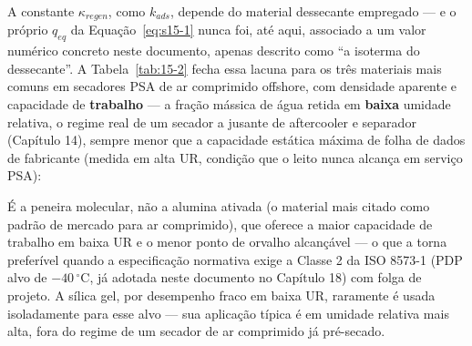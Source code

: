 \documentclass[12pt,a4paper]{article}
\numberwithin{equation}{section}
\numberwithin{table}{section}
\numberwithin{figure}{section}
\begin{document}
{		A constante $\kappa_{regen}$, como $k_{ads}$, depende do material dessecante empregado — e o próprio $q_{eq}$ da Equação~\eqref{eq:s15-1} nunca foi, até aqui, associado a um valor numérico concreto neste documento, apenas descrito como ``a isoterma do dessecante''. A Tabela~\ref{tab:15-2} fecha essa lacuna para os três materiais mais comuns em secadores PSA de ar comprimido offshore, com densidade aparente e capacidade de \textbf{trabalho} — a fração mássica de água retida em \textbf{baixa} umidade relativa, o regime real de um secador a jusante de aftercooler e separador (Capítulo 14), sempre menor que a capacidade estática máxima de folha de dados de fabricante (medida em alta UR, condição que o leito nunca alcança em serviço PSA):

		\begin{table}[h!tbp]
			\centering
			\caption[Propriedades de referência dos materiais dessecantes]{Propriedades de referência dos materiais dessecantes mais comuns em secadores PSA de ar comprimido — densidade aparente e capacidade de trabalho em baixa UR (ASSUMIDO, faixas típicas de literatura/fabricante), constante de taxa de adsorção e tempos de regeneração/resfriamento de referência.}
			\label{tab:15-2}
		\end{table}

		É a peneira molecular, não a alumina ativada (o material mais citado como padrão de mercado para ar comprimido), que oferece a maior capacidade de trabalho em baixa UR e o menor ponto de orvalho alcançável — o que a torna preferível quando a especificação normativa exige a Classe 2 da ISO 8573-1 (PDP alvo de $-40\,^{\circ}\text{C}$, já adotada neste documento no Capítulo 18) com folga de projeto. A sílica gel, por desempenho fraco em baixa UR, raramente é usada isoladamente para esse alvo — sua aplicação típica é em umidade relativa mais alta, fora do regime de um secador de ar comprimido já pré-secado.

}
\end{document}
